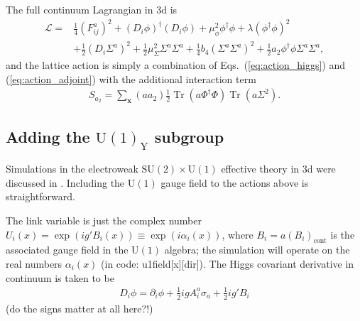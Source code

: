 \documentclass[11pt,a4paper]{article}
\newcommand\Tr{\operatorname{Tr}}
\newcommand\he[1]{#1^\dagger}%
\newcommand\gr[1]{\mathrm{#1}}%
\newcommand\lauri[1]{{\color{myorange}#1}}
\begin{document}
The full continuum Lagrangian in 3d is 
\begin{align}
\mathcal{L} =& \frac14 (F^a_{ij})^2 + (D_i \phi)^\dagger (D_i \phi) + \mu^2_\phi \phi^\dagger\phi + \lambda (\phi^\dagger\phi)^2 \nonumber \\ 
& + \frac12 (D_i \Sigma^a)^2 + \frac12 \mu^2_\Sigma \Sigma^a\Sigma^a + \frac14 b_4 (\Sigma^a\Sigma^a)^2 +\frac12 a_2 \phi^\dagger\phi \Sigma^a\Sigma^a,
\end{align}
and the lattice action is simply a combination of Eqs.~(\ref{eq:action_higgs}) and (\ref{eq:action_adjoint}) with the additional interaction term
\begin{align}
S_{a_2} = \sum_\textbf{x} (a a_2) \frac12 \Tr (a\he\Phi\Phi) \Tr (a\Sigma^2). 
\end{align}


\subsection{Adding the $\gr{U(1)_Y}$ subgroup}

Simulations in the electroweak $\gr{SU(2) \times U(1)}$ effective theory in 3d were discussed in \cite{Kajantie:1996qd}. Including the $\gr{U(1)}$ gauge field to the actions above is straightforward. 

The link variable is just the complex number $U_i(x) = \exp(i g' B_i(x)) \equiv \exp(i \alpha_i(x))$, where $B_i = a (B_i)_\text{cont}$ is the associated gauge field in the $\gr{U(1)}$ algebra; the simulation will operate on the real numbers $\alpha_i(x)$ (in code: u1field[x][dir]). The Higgs covariant derivative in continuum is taken to be 
\begin{align}
D_i \phi = \partial_i \phi + \frac12 i g A^a_i \sigma_a + \frac12 i g' B_i 
\end{align}
\lauri{(do the signs matter at all here?!)}
\end{document}
